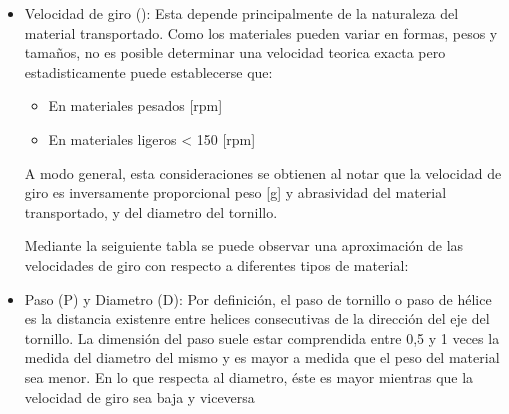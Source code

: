 \begin{itemize}
\begin{itemize}
\item Velocidad de giro (\eta): Esta depende principalmente de la naturaleza del material transportado. Como los materiales pueden variar en formas, pesos y tamaños, no es posible determinar una velocidad teorica exacta pero estadisticamente puede establecerse que:
	\begin{itemize}
	\item En materiales pesados \eta {} [rpm]
	\item En materiales ligeros \eta < 150 [rpm]
	\end{itemize}
A modo general, esta consideraciones se obtienen al notar que la velocidad de giro es inversamente proporcional peso [g] y abrasividad del material transportado, y del diametro del tornillo.

Mediante la seiguiente tabla se puede observar una aproximación de las velocidades de giro con respecto a diferentes tipos de material:


\item Paso (P) y Diametro (D): Por definición, el paso de tornillo o paso de hélice es la distancia existenre entre helices consecutivas de la dirección del eje del tornillo. La dimensión del paso suele estar comprendida entre 0,5 y 1 veces la medida del diametro del mismo y es mayor a medida que el peso del material sea menor. En lo que respecta al diametro, éste es mayor mientras que la velocidad de giro sea baja y viceversa


\end{itemize}
\end{itemize}
